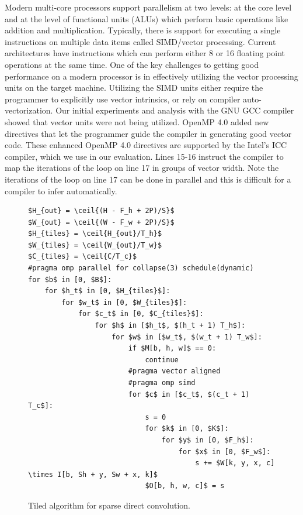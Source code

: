 \documentclass{article}
\begin{document}
Modern multi-core processors support parallelism at two levels: at the core
level and at the level of functional units (ALUs) which perform basic
operations like addition and multiplication. Typically, there is support for
executing a single instructions on multiple data items called SIMD/vector
processing.  Current architectures have instructions which can perform either 8
or 16 floating point operations at the same time. One of the key challenges to
getting good performance on a modern processor is in effectively utilizing the
vector processing units on the target machine. Utilizing the SIMD units either
require the programmer to explicitly use vector intrinsics, or rely on compiler
auto-vectorization. Our initial experiments and analysis with the GNU GCC compiler
showed that vector units were not being utilized. OpenMP 4.0 added new directives
that let the programmer guide the compiler in generating good vector code. These
enhanced OpenMP 4.0 directives are supported by the Intel's ICC compiler, which
we use in our evaluation. Lines 15-16 instruct the compiler to map the iterations 
of the loop on line 17 in groups of vector width. Note the iterations of the loop 
on line 17 can be done in parallel and this is difficult for a compiler to infer
automatically.

\begin{figure}
\begin{lstlisting}[mathescape]
$H_{out} = \ceil{(H - F_h + 2P)/S}$
$W_{out} = \ceil{(W - F_w + 2P)/S}$
$H_{tiles} = \ceil{H_{out}/T_h}$
$W_{tiles} = \ceil{W_{out}/T_w}$
$C_{tiles} = \ceil{C/T_c}$
#pragma omp parallel for collapse(3) schedule(dynamic)
for $b$ in [0, $B$]:
    for $h_t$ in [0, $H_{tiles}$]:
        for $w_t$ in [0, $W_{tiles}$]:
            for $c_t$ in [0, $C_{tiles}$]:
                for $h$ in [$h_t$, $(h_t + 1) T_h$]:
                    for $w$ in [$w_t$, $(w_t + 1) T_w$]:
                        if $M[b, h, w]$ == 0:
                            continue
                        #pragma vector aligned
                        #pragma omp simd
                        for $c$ in [$c_t$, $(c_t + 1) T_c$]:
                            s = 0
                            for $k$ in [0, $K$]:
                                for $y$ in [0, $F_h$]:
                                    for $x$ in [0, $F_w$]:
                                        s += $W[k, y, x, c] \times I[b, Sh + y, Sw + x, k]$
                            $O[b, h, w, c]$ = s

\end{lstlisting}
    \caption{Tiled algorithm for sparse direct convolution.}
    \label{fig:conv_algo}
\end{figure}
\end{document}
